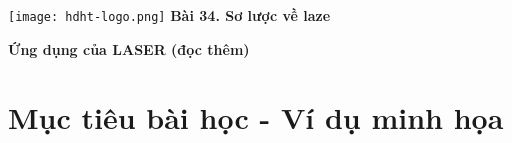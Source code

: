 \newcommand{\chapter}[2][]{
	\newcommand{\chapname}{#2}
	\begin{flushleft}
		\begin{minipage}[t]{\linewidth}
			\texttt{[image: hdht-logo.png]}
			\hspace{0pt}	
			\sffamily\bfseries\large Bài 34. Sơ lược về laze
			\begin{flushleft}
				\huge\bfseries #1
			\end{flushleft}
		\end{minipage}
	\end{flushleft}
	\vspace{1cm}
	\normalfont\normalsize
}
\chapter[Ứng dụng của LASER (đọc thêm)]{Ứng dụng của LASER (đọc thêm)}

\section{Mục tiêu bài học - Ví dụ minh họa}

